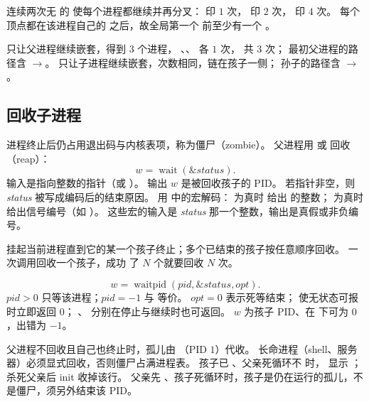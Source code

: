 
连续两次无  的  使每个进程都继续并再分叉：
 印 $1$ 次， 印 $2$ 次， 印 $4$ 次。
每个  顶点都在该进程自己的  之后，故全局第一个  前至少有一个 。

 只让父进程继续嵌套，得到 $3$ 个进程，
、、 各 $1$ 次， 共 $3$ 次；
最初父进程的路径含 $\to$。
 只让子进程继续嵌套，次数相同，链在孩子一侧；
孙子的路径含 $\to$。

\subsection{回收子进程}

进程终止后仍占用退出码与内核表项，称为僵尸（zombie）。
父进程用  或  回收（reap）：
\[
w=\operatorname{wait}(\&\textit{status}).
\]
输入是指向整数的指针（或 ）。
输出 $w$ 是被回收孩子的 PID。
若指针非空，则 \textit{status} 被写成编码后的结束原因。
用  中的宏解码：
 为真时  给出  的整数；
 为真时  给出信号编号（如 ）。
这些宏的输入是 \textit{status} 那一个整数，输出是真假或非负编号。

 挂起当前进程直到它的某一个孩子终止；多个已结束的孩子按任意顺序回收。
一次调用回收一个孩子，成功  了 $N$ 个就要回收 $N$ 次。

\[
w=\operatorname{waitpid}(\textit{pid},\&\textit{status},\textit{opt}).
\]
$\textit{pid}>0$ 只等该进程；$\textit{pid}=-1$ 与  等价。
$\textit{opt}=0$ 表示死等结束；
 使无状态可报时立即返回 $0$；
、 分别在停止与继续时也可返回。
$w$ 为孩子 PID、在  下可为 $0$，出错为 $-1$。

父进程不回收且自己也终止时，孤儿由 （PID $1$）代收。
长命进程（shell、服务器）必须显式回收，否则僵尸占满进程表。
孩子已 、父亲死循环不  时， 显示 ；
杀死父亲后 init 收掉该行。
父亲先 、孩子死循环时，孩子是仍在运行的孤儿，不是僵尸，须另外结束该 PID。


